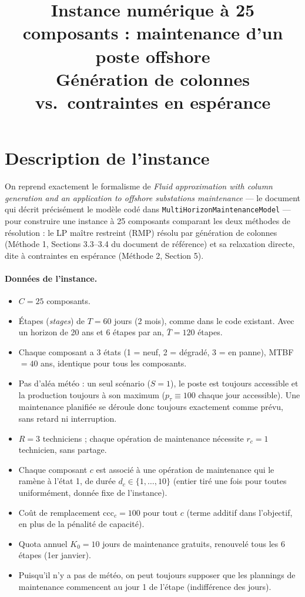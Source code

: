 \documentclass[11pt]{article}
\title{Instance numérique à 25 composants : maintenance d'un poste offshore\\
\large Génération de colonnes vs.\ contraintes en espérance}
\author{}
\date{}
\begin{document}
\maketitle

\section{Description de l'instance}

On reprend exactement le formalisme de \emph{Fluid approximation with column generation and an
application to offshore substations maintenance} --- le document qui décrit précisément le modèle codé
dans \texttt{MultiHorizonMaintenanceModel} --- pour construire une instance à 25 composants comparant
les deux méthodes de résolution : le LP maître restreint (RMP) résolu par génération de colonnes
(Méthode 1, Sections 3.3--3.4 du document de référence) et sa relaxation directe, dite à contraintes en
espérance (Méthode 2, Section 5).

\paragraph{Données de l'instance.}
\begin{itemize}
  \item $C = 25$ composants.
  \item Étapes (\emph{stages}) de $T=60$ jours (2 mois), comme dans le code existant. Avec un horizon
        de 20 ans et 6 étapes par an, $\bar{T} = 120$ étapes.
  \item Chaque composant a 3 états (1 = neuf, 2 = dégradé, 3 = en panne), MTBF $=40$ ans, identique pour
        tous les composants.
  \item Pas d'aléa météo : un seul scénario ($S=1$), le poste est toujours accessible et la production
        toujours à son maximum ($p_\tau \equiv 100$ chaque jour accessible). Une maintenance planifiée se
        déroule donc toujours exactement comme prévu, sans retard ni interruption.
  \item $R=3$ techniciens ; chaque opération de maintenance nécessite $r_c=1$ technicien, sans partage.
  \item Chaque composant $c$ est associé à une opération de maintenance qui le ramène à l'état 1, de durée
        $d_c \in \{1,\dots,10\}$ (entier tiré une fois pour toutes uniformément, donnée fixe de l'instance).
  \item Coût de remplacement $\mathrm{ccc}_c = 100$ pour tout $c$ (terme additif dans l'objectif, en
        plus de la pénalité de capacité).
  \item Quota annuel $K_0=10$ jours de maintenance gratuits, renouvelé tous les 6 étapes (1er janvier).
  \item Puisqu'il n'y a pas de météo, on peut toujours supposer que les plannings de maintenance
        commencent au jour 1 de l'étape (indifférence des jours).
\end{itemize}
\end{document}
